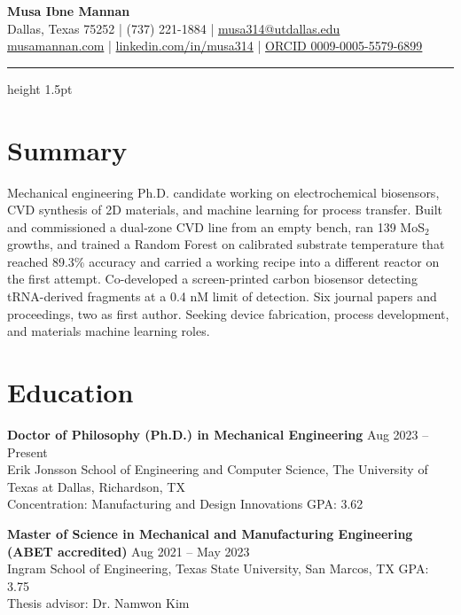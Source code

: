 \documentclass[11pt, letterpaper]{article}
\newcommand{\role}[2]{\textbf{#1} \hfill #2 \\}
\begin{document}
\pagestyle{empty}

\begin{center}
    {\LARGE\bfseries Musa Ibne Mannan}\\[5pt]
    Dallas, Texas 75252 \quad | \quad (737) 221-1884 \quad | \quad
    \href{mailto:musa314@utdallas.edu}{musa314@utdallas.edu}\\[3pt]
    \href{https://musamannan.com}{musamannan.com} \quad | \quad
    \href{https://www.linkedin.com/in/musa314/}{linkedin.com/in/musa314} \quad | \quad
    \href{https://orcid.org/0009-0005-5579-6899}{ORCID 0009-0005-5579-6899}
\end{center}
\vspace{-4pt}
\hrule height 1.5pt
\vspace{6pt}

\section{Summary}
Mechanical engineering Ph.D. candidate working on electrochemical biosensors, CVD synthesis of 2D materials, and
machine learning for process transfer. Built and commissioned a dual-zone CVD line from an empty bench, ran 139
MoS$_2$ growths, and trained a Random Forest on calibrated substrate temperature that reached 89.3\% accuracy and
carried a working recipe into a different reactor on the first attempt. Co-developed a screen-printed carbon
biosensor detecting tRNA-derived fragments at a 0.4 nM limit of detection. Six journal papers and proceedings, two
as first author. Seeking device fabrication, process development, and materials machine learning roles.

\section{Education}
\role{Doctor of Philosophy (Ph.D.) in Mechanical Engineering}{Aug 2023 -- Present}
Erik Jonsson School of Engineering and Computer Science, The University of Texas at Dallas, Richardson, TX \\
Concentration: Manufacturing and Design Innovations \quad GPA: 3.62

\role{Master of Science in Mechanical and Manufacturing Engineering (ABET accredited)}{Aug 2021 -- May 2023}
Ingram School of Engineering, Texas State University, San Marcos, TX \quad GPA: 3.75 \\
Thesis advisor: Dr. Namwon Kim
\end{document}

